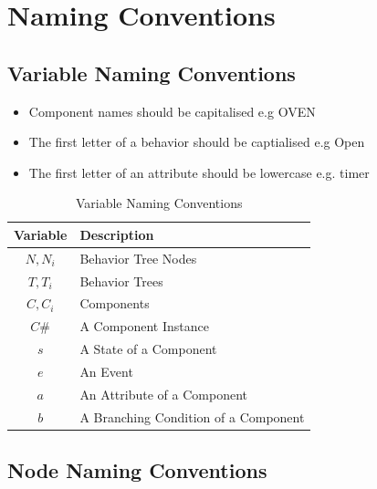 \documentclass[]{article}
\begin{document}
\section{Naming Conventions}

\subsection{Variable Naming Conventions}

\begin{itemize}
\item Component names should be capitalised e.g OVEN
\item The first letter of a behavior should be captialised e.g Open
\item The first letter of an attribute should be lowercase e.g. timer
\end{itemize}

\begin{table}
\begin{tabularx}{\textwidth}{|c|X|}
\textbf{Variable} & \textbf{Description}\\ \hline
$N,N_i$ & Behavior Tree Nodes\\ \hline
$T,T_i$ & Behavior Trees\\ \hline
$C,C_i$ & Components\\ \hline
$C\#$ & A Component Instance\\ \hline
$s$ & A State of a Component\\ \hline
$e$ & An Event\\ \hline
$a$ & An Attribute of a Component\\ \hline
$b$ & A Branching Condition of a Component
\end{tabularx}
\caption{Variable Naming Conventions}
\label{Variable Naming Conventions}
\end{table}

\subsection{Node Naming Conventions}
\end{document}
